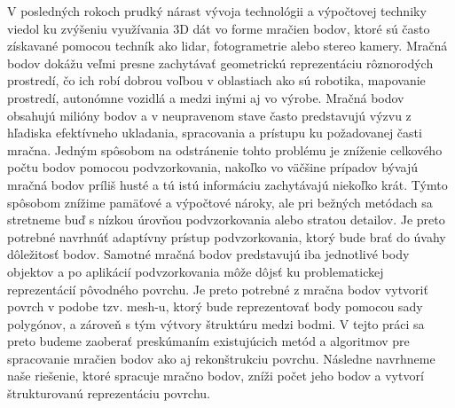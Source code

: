 \noindent V posledných rokoch prudký nárast vývoja technológii a výpočtovej techniky viedol ku zvýšeniu využívania 3D dát vo forme mračien bodov, ktoré sú často získavané pomocou techník ako \acrshort{lidar}, fotogrametrie alebo stereo kamery. Mračná bodov dokážu veľmi presne zachytávať geometrickú reprezentáciu rôznorodých prostredí, čo ich robí dobrou voľbou v oblastiach ako sú robotika, mapovanie prostredí, autonómne vozidlá a medzi inými aj vo výrobe.
\newline\indent Mračná bodov obsahujú milióny bodov a v neupravenom stave často predstavujú výzvu z hľadiska efektívneho ukladania, spracovania a prístupu ku požadovanej časti mračna. Jedným spôsobom na odstránenie tohto problému je zníženie celkového počtu bodov pomocou podvzorkovania, nakoľko vo väčšine prípadov bývajú mračná bodov príliš husté a tú istú informáciu zachytávajú niekoľko krát. Týmto spôsobom znížime pamäťové a výpočtové nároky, ale pri bežných metódach sa stretneme buď s nízkou úrovňou podvzorkovania alebo stratou detailov. Je preto potrebné navrhnúť adaptívny prístup podvzorkovania, ktorý bude brať do úvahy dôležitosť bodov.
\newline\indent Samotné mračná bodov predstavujú iba jednotlivé body objektov a po aplikácií podvzorkovania môže dôjsť ku problematickej reprezentácií pôvodného povrchu. Je preto potrebné z mračna bodov vytvoriť povrch v podobe tzv. mesh-u, ktorý bude reprezentovať body pomocou sady polygónov, a zároveň s tým výtvory štruktúru medzi bodmi.
\newline\indent V tejto práci sa preto budeme zaoberať preskúmaním existujúcich metód a algoritmov pre spracovanie mračien bodov ako aj rekonštrukciu povrchu. Následne navrhneme naše riešenie, ktoré spracuje mračno bodov, zníži počet jeho bodov a vytvorí štrukturovanú reprezentáciu povrchu.